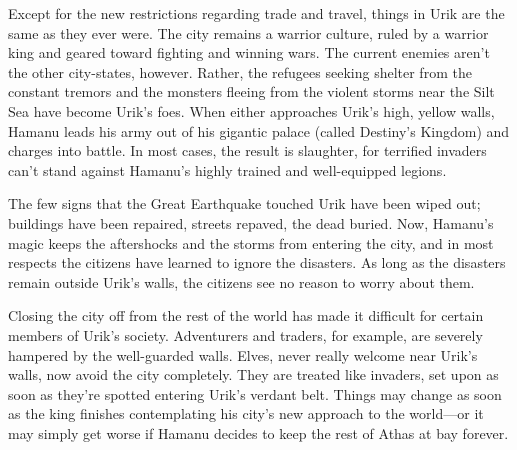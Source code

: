 {

	Except for the new restrictions regarding trade and travel, things in Urik are the same as they ever were. The city remains a warrior culture, ruled by a warrior king and geared toward fighting and winning wars. The current enemies aren't the other city-states, however. Rather, the refugees seeking shelter from the constant tremors and the monsters fleeing from the violent storms near the Silt Sea have become Urik's foes. When either approaches Urik's high, yellow walls, Hamanu leads his army out of his gigantic palace (called Destiny's Kingdom) and charges into battle. In most cases, the result is slaughter, for terrified invaders can't stand against Hamanu's highly trained and well-equipped legions.

	The few signs that the Great Earthquake touched Urik have been wiped out; buildings have been repaired, streets repaved, the dead buried. Now, Hamanu's magic keeps the aftershocks and the storms from entering the city, and in most respects the citizens have learned to ignore the disasters. As long as the disasters remain outside Urik's walls, the citizens see no reason to worry about them.

	Closing the city off from the rest of the world has made it difficult for certain members of Urik's society. Adventurers and traders, for example, are severely hampered by the well-guarded walls. Elves, never really welcome near Urik's walls, now avoid the city completely. They are treated like invaders, set upon as soon as they're spotted entering Urik's verdant belt. Things may change as soon as the king finishes contemplating his city's new approach to the world---or it may simply get worse if Hamanu decides to keep the rest of Athas at bay forever.
}

